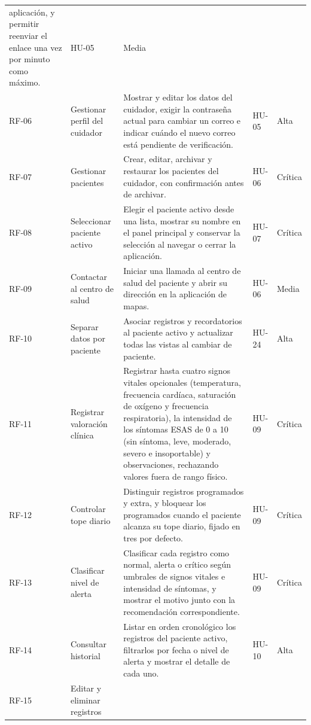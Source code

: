 \begin{xltabular}{\textwidth}{P{0.42}P{0.95}P{2.33}P{0.55}P{0.75}}
    aplicación, y permitir reenviar el enlace una vez por minuto como máximo. & HU-05 & Media \\
    RF-06 & Gestionar perfil del cuidador &
    Mostrar y editar los datos del cuidador, exigir la contraseña actual para
    cambiar un correo e indicar cuándo el nuevo correo está pendiente de
    verificación. & HU-05 & Alta \\
    RF-07 & Gestionar pacientes &
    Crear, editar, archivar y restaurar los pacientes del cuidador, con
    confirmación antes de archivar. & HU-06 & Crítica \\
    RF-08 & Seleccionar paciente activo &
    Elegir el paciente activo desde una lista, mostrar su nombre en el panel
    principal y conservar la selección al navegar o cerrar la aplicación. & HU-07 & Crítica \\
    RF-09 & Contactar al centro de salud &
    Iniciar una llamada al centro de salud del paciente y abrir su dirección en
    la aplicación de mapas. & HU-06 & Media \\
    RF-10 & Separar datos por paciente &
    Asociar registros y recordatorios al paciente activo
    y actualizar todas las vistas al cambiar de paciente. & HU-24 & Alta \\
    RF-11 & Registrar valoración clínica &
    Registrar hasta cuatro signos vitales opcionales (temperatura, frecuencia
    cardíaca, saturación de oxígeno y frecuencia respiratoria), la intensidad de
    los síntomas ESAS de 0 a 10 (sin síntoma, leve, moderado, severo e insoportable) y
    observaciones, rechazando valores fuera de
    rango físico. & HU-09 & Crítica \\
    RF-12 & Controlar tope diario &
    Distinguir registros programados y extra, y bloquear los programados cuando
    el paciente alcanza su tope diario, fijado en tres por defecto. & HU-09 & Crítica \\
    RF-13 & Clasificar nivel de alerta &
    Clasificar cada registro como normal, alerta o crítico según umbrales de
    signos vitales e intensidad de síntomas, y mostrar el motivo junto con la
    recomendación correspondiente. & HU-09 & Crítica \\
    RF-14 & Consultar historial &
    Listar en orden cronológico los registros del paciente activo, filtrarlos
    por fecha o nivel de alerta y mostrar el detalle de cada uno. & HU-10 & Alta \\
    RF-15 & Editar y eliminar registros &

\end{xltabular}
